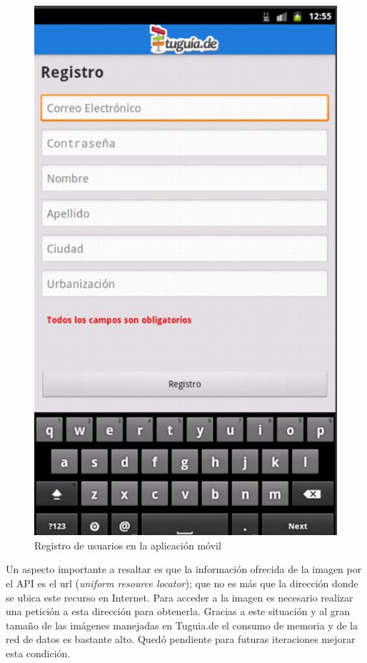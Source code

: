 \begin{figure}[h]
	\begin{center}
		\includegraphics[scale=0.5]{imagenes/login_1.png}
	\end{center}
	\caption{
		\label{fig:register}
		Registro de usuarios en la aplicación móvil
	}
\end{figure}

Un aspecto importante a resaltar es que la información ofrecida de la imagen por el API es el url (\textit{uniform resource locator}); que no es más que la dirección donde se ubica este recurso en Internet. Para acceder a la imagen es necesario realizar una petición a esta dirección para obtenerla. Gracias a este situación y al gran tamaño de las imágenes manejadas en Tuguia.de el consumo de memoria y de la red de datos es bastante alto. Quedó pendiente para futuras iteraciones mejorar esta condición. 
  
